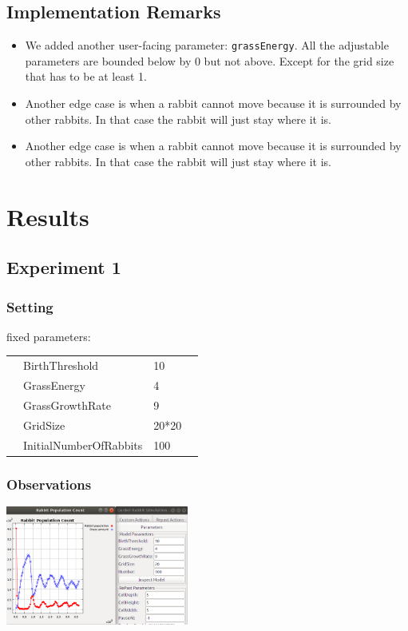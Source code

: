 \documentclass[11pt]{article}
\begin{document}
 \subsection{Implementation Remarks}
 \begin{itemize}

   \item
   We added another user-facing  parameter: \texttt{grassEnergy}. All the
 adjustable parameters are bounded  below by 0 but not above. Except for the
 grid size that has to be at least 1.

 \item
 Another edge case is when a rabbit cannot move because it is surrounded by
 other rabbits. In that case the rabbit will just stay where it is.

  \item
 Another edge case is when a rabbit cannot move because it is surrounded by
 other rabbits. In that case the rabbit will just stay where it is.

 \end{itemize}

 \newpage

 \section{Results}

 \subsection{Experiment 1}
 \subsubsection{Setting}
 fixed parameters:
 \begin{table}[H]
  \begin{tabular}{llll}
   &BirthThreshold  &10\\
   &GrassEnergy  &4 \\
   &GrassGrowthRate  &9\\
   &GridSize  &20*20\\
   &InitialNumberOfRabbits  &100
  \end{tabular}
 \end{table}
 
 \subsubsection{Observations}
 
 \begin{center}
 \includegraphics[width=6cm]{exp1.png}
 \end{center}
 
\end{document}
